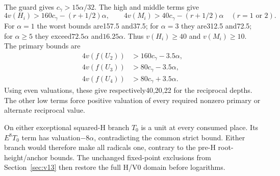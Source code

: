 The guard gives $c_\gamma>15\alpha/32$. The high and middle
terms give
\[
 4v(H_i)>160c_\gamma-(r+1/2)\alpha,\qquad
 4v(M_i)>40c_\gamma-(r+1/2)\alpha\quad(r=1\text{ or }2).
\]
For $\alpha=1$ the worst bounds are157.5 and37.5; for
$\alpha=3$ they are312.5 and72.5; for $\alpha\geq5$ they
exceed$72.5\alpha$ and$16.25\alpha$. Thus $v(H_i)\geq40$
and $v(M_i)\geq10$. The primary bounds are
\[
 \begin{split}
 4v(f(U_2))&>160c_\gamma-3.5\alpha,\\
 4v(f(U_3))&>80c_\gamma-3.5\alpha,\\
 4v(f(U_4))&>80c_\gamma+3.5\alpha.
 \end{split}
\]
Using even valuations, these give respectively40,20,22 for the
reciprocal depths. The other low terms force positive valuation
of every required nonzero primary or alternate reciprocal value.

On either exceptional squared-H branch $T_0$ is a unit at every
consumed place. Its $E^8T_0$ term has valuation$-8\alpha$,
contradicting the common strict bound. Either branch would
therefore make all radicals one, contrary to the pre-H
root-height/anchor bounds. The unchanged fixed-point exclusions
from Section~\ref{sec:v13} then restore the full H/V0 domain
before logarithms.
